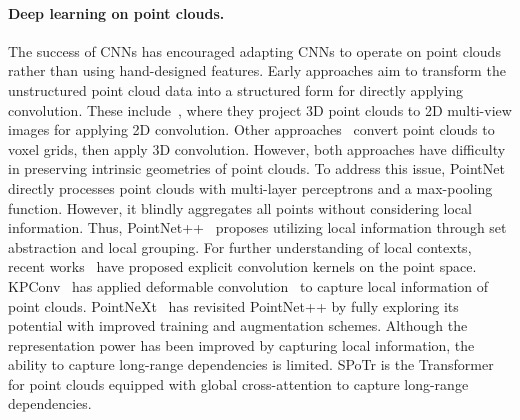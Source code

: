 \documentclass[10pt,twocolumn,letterpaper]{article}
\begin{document}
\paragraph{Deep learning on point clouds.}
The success of CNNs has encouraged adapting CNNs to operate on point clouds rather than using hand-designed features.
Early approaches aim to transform the unstructured point cloud data into a structured form for directly applying convolution.
These include~\cite{su2015multi,guo2016multi,qi2016volumetric,jaritz2019multi,goyal2021revisiting,hamdi2021mvtn}, where they project 3D point clouds to 2D multi-view images for applying 2D convolution.
Other approaches~\cite{liu2019point,maturana2015voxnet,zhou2018voxelnet} convert point clouds to voxel grids, then apply 3D convolution.
However, both approaches have difficulty in preserving intrinsic geometries of point clouds.
To address this issue,  PointNet \cite{qi2017pointnet} directly processes point clouds with multi-layer perceptrons and a max-pooling function. 
However, it blindly aggregates all points without considering local information.
Thus, PointNet++~\cite{qi2017pointnet++} proposes utilizing local information through set abstraction and local grouping.
For further understanding of local contexts, recent works~\cite{atzmon2018point,li2018pointcnn,wu2019pointconv,thomas2019kpconv,wang2018deep,xu2021paconv,xu2018spidercnn,zhou2021adaptive,ma2022rethinking, ran2022surface} have proposed explicit convolution kernels on the point space.
KPConv~\cite{thomas2019kpconv} has applied deformable convolution~\cite{dai2017deformable,zhu2019deformable} to capture local information of point clouds.
PointNeXt~\cite{qian2022pointnext} has revisited PointNet++ by fully exploring its potential with improved training and augmentation schemes.
Although the representation power has been improved by capturing local information, the ability to capture long-range dependencies is limited.
SPoTr is the Transformer for point clouds equipped with global cross-attention to capture long-range dependencies.   
\end{document}
